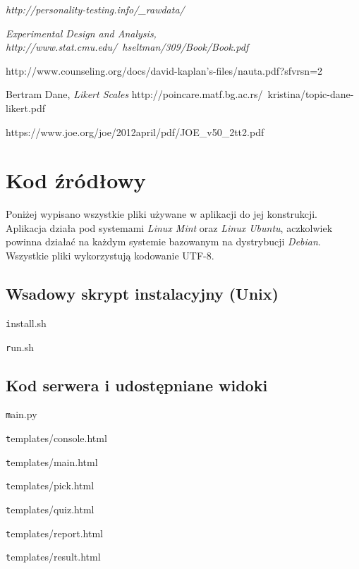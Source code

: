 \documentclass[12pt,a4paper,oneside]{report} %
\begin{document}
\begin{thebibliography}{9}
 \emph{http://personality-testing.info/\_rawdata/}

 \emph{Experimental Design and Analysis, http://www.stat.cmu.edu/~hseltman/309/Book/Book.pdf}

 http://www.counseling.org/docs/david-kaplan's-files/nauta.pdf?sfvrsn=2

 Bertram Dane, \emph{Likert Scales} http://poincare.matf.bg.ac.rs/~kristina/topic-dane-likert.pdf

   https://www.joe.org/joe/2012april/pdf/JOE\_v50\_2tt2.pdf

\end{thebibliography}

\listoffigures

\listoftables

\appendix
\chapter{Kod źródłowy}
Poniżej wypisano wszystkie pliki używane w aplikacji do jej konstrukcji. Aplikacja działa pod systemami \emph{Linux Mint} oraz \emph{Linux Ubuntu}, aczkolwiek powinna działać na każdym systemie bazowanym na dystrybucji \emph{Debian}. Wszystkie pliki wykorzystują kodowanie UTF-8.
\section{Wsadowy skrypt instalacyjny (Unix)}
{\large\texttt install.sh\par}

{\large\texttt run.sh\par}

\section{Kod serwera i udostępniane widoki}
{\large\texttt main.py\par}

{\large\texttt templates/console.html\par}

{\large\texttt templates/main.html\par}

{\large\texttt templates/pick.html\par}

{\large\texttt templates/quiz.html\par}

{\large\texttt templates/report.html\par}

{\large\texttt templates/result.html\par}

\end{document}
